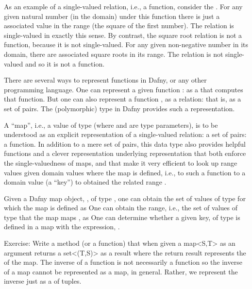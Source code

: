 \documentclass[letterpaper,10pt,english]{sphinxmanual}
\begin{document}
As an example of a single-valued relation, i.e., a function, consider
the . For any given natural number (in the domain) under this
function there is just a  associated value in the range (the
square of the first number). The relation is single-valued in exactly
this sense. By contrast, the square root relation is not a function,
because it is not single-valued. For any given non-negative number in
its domain, there are  associated square roots in its range. The
relation is not single-valued and so it is not a function.

There are several ways to represent functions in Dafny, or any other
programming language. One can represent a given function :
as a  that computes that function. But one can also represent
a function , as a relation: that is, as a set of pairs.
The (polymorphic)  type in Dafny provides such a representation.

A “map”, i.e., a value of type  (where  and  are type
parameters), is to be understood as an explicit representation of a
single-valued relation: a set of pairs: a function. In addition to a
mere set of pairs, this data type also provides helpful functions and
a clever representation underlying representation that both enforce
the single-valuedness of maps, and that make it very efficient to look
up range values given domain values where the map is defined, i.e., to
 such a function to a domain value (a “key”) to obtained the
related range .

Given a Dafny map object, , of type , one can obtain the
set of values of type  for which the map is defined as 
One can obtain the range, i.e., the set of values of type  that the
map maps , as  One can determine whether a given key,
 of type  is defined in a map with the expression, .

Exercise: Write a method (or a function) that when given a map\textless{}S,T\textgreater{} as
an argument returns a set\textless{}(T,S)\textgreater{} as a result where the return result
represents the  of the map. The inverse of a function is not
necessarily a function so the inverse of a map cannot be represented
as a map, in general. Rather, we represent the inverse just as a 
of  tuples.
\end{document}
